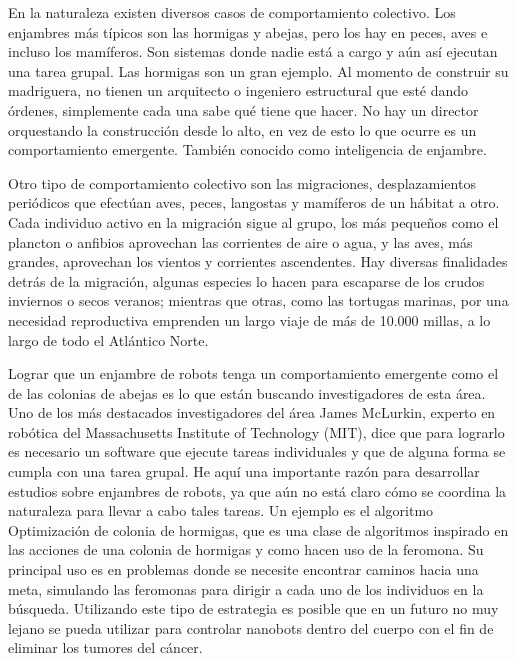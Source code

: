 En la naturaleza existen diversos casos de comportamiento colectivo. Los enjambres más típicos son las hormigas y abejas, pero los hay en peces, aves e incluso los mamíferos. Son sistemas donde nadie está a cargo y aún así ejecutan una tarea grupal. Las hormigas son un gran ejemplo. Al momento de construir su madriguera, no tienen un arquitecto o ingeniero estructural que esté dando órdenes, simplemente cada una sabe qué tiene que hacer. No hay un director orquestando la construcción desde lo alto, en vez de esto lo que ocurre es un comportamiento emergente. También conocido como inteligencia de enjambre.

Otro tipo de comportamiento colectivo son las migraciones, desplazamientos periódicos que efectúan aves, peces, langostas y mamíferos de un hábitat a otro. Cada individuo activo en la migración sigue al grupo, los más pequeños como el plancton o anfibios aprovechan las corrientes de aire o agua, y las aves, más grandes, aprovechan los vientos y corrientes ascendentes. Hay diversas finalidades detrás de la migración, algunas especies lo hacen para escaparse de los crudos inviernos o secos veranos; mientras que otras, como las tortugas marinas, por una necesidad reproductiva emprenden un largo viaje de más de 10.000 millas, a lo largo de todo el Atlántico Norte.

Lograr que un enjambre de robots tenga un comportamiento emergente como el de las colonias de abejas es lo que están buscando investigadores de esta área. Uno de los más destacados investigadores del área James McLurkin, experto en robótica del Massachusetts Institute of Technology (MIT), dice que para lograrlo es necesario un software que ejecute tareas individuales y que de alguna forma se cumpla con una tarea grupal. He aquí una importante razón para desarrollar estudios sobre enjambres de robots, ya que aún no está claro cómo se coordina la naturaleza para llevar a cabo tales tareas. Un ejemplo es el algoritmo Optimización de colonia de hormigas, que es una clase de algoritmos inspirado en las acciones de una colonia de hormigas y como hacen uso de la feromona. Su principal uso es en problemas donde se necesite encontrar caminos hacia una meta, simulando las feromonas para dirigir a cada uno de los individuos en la búsqueda. Utilizando este tipo de estrategia es posible que en un futuro no muy lejano se pueda utilizar para controlar nanobots dentro del cuerpo con el fin de eliminar los tumores del cáncer.

